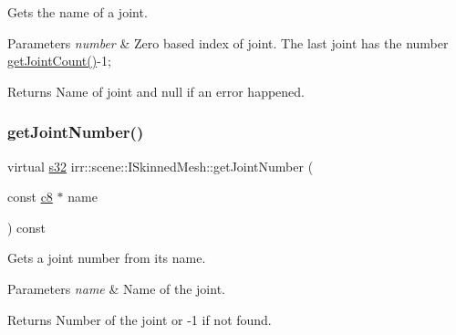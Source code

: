 Gets the name of a joint. 


\begin{DoxyParams}{Parameters}
{\em number} & Zero based index of joint. The last joint has the number \hyperlink{classirr_1_1scene_1_1ISkinnedMesh_a7715fb82ffec225d2fd9b8aa860e3c38}{get\+Joint\+Count()}-\/1; \\
\hline
\end{DoxyParams}
\begin{DoxyReturn}{Returns}
Name of joint and null if an error happened. 
\end{DoxyReturn}
\mbox{\label{classirr_1_1scene_1_1ISkinnedMesh_ace7288f54490d017efebe24c3eb46ab8}} 
\subsubsection{\texorpdfstring{get\+Joint\+Number()}{getJointNumber()}}
{\footnotesize\ttfamily virtual \hyperlink{namespaceirr_ac66849b7a6ed16e30ebede579f9b47c6}{s32} irr\+::scene\+::\+I\+Skinned\+Mesh\+::get\+Joint\+Number (\begin{DoxyParamCaption}\item[{const \hyperlink{namespaceirr_a9395eaea339bcb546b319e9c96bf7410}{c8} $\ast$}]{name }\end{DoxyParamCaption}) const\hspace{0.3cm}{\ttfamily [pure virtual]}}



Gets a joint number from its name. 


\begin{DoxyParams}{Parameters}
{\em name} & Name of the joint. \\
\hline
\end{DoxyParams}
\begin{DoxyReturn}{Returns}
Number of the joint or -\/1 if not found. 
\end{DoxyReturn}
\mbox{\label{classirr_1_1scene_1_1ISkinnedMesh_a19f264883a006d68b44f8b81d8ff5927}} 
